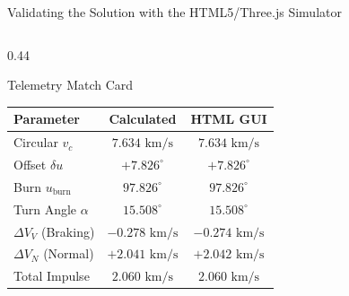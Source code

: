 \documentclass[aspectratio=169,10pt]{beamer}
\begin{document}
\begin{frame}{Validating the Solution with the HTML5/Three.js Simulator}
\begin{columns}[t]
        \begin{column}{0.44\textwidth}
            \begin{exampleblock}{Telemetry Match Card}
                \scriptsize
                \begin{tabular}{lcc}
                    \toprule
                    \textbf{Parameter} & \textbf{Calculated} & \textbf{HTML GUI} \\
                    \midrule
                    Circular $v_c$ & $7.634\text{ km/s}$ & $7.634\text{ km/s}$ \\
                    Offset $\delta u$ & $+7.826^\circ$ & $+7.826^\circ$ \\
                    Burn $u_{\text{burn}}$ & $97.826^\circ$ & $97.826^\circ$ \\
                    Turn Angle $\alpha$ & $15.508^\circ$ & $15.508^\circ$ \\
                    $\Delta V_V$ (Braking) & $-0.278\text{ km/s}$ & $-0.274\text{ km/s}$ \\
                    $\Delta V_N$ (Normal) & $+2.041\text{ km/s}$ & $+2.042\text{ km/s}$ \\
                    Total Impulse & $2.060\text{ km/s}$ & $2.060\text{ km/s}$ \\
                    \bottomrule
                \end{tabular}
            \end{exampleblock}
        \end{column}
    \end{columns}
\end{frame}
\end{document}
